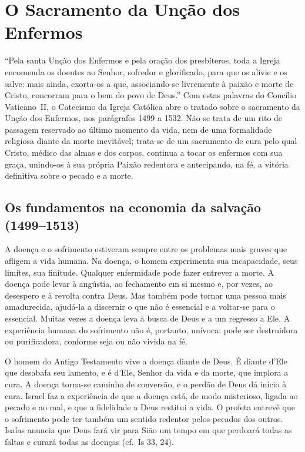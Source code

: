 \chapter{O Sacramento da Unção dos Enfermos}

``Pela santa Unção dos Enfermos e pela oração dos presbíteros, toda a Igreja encomenda os doentes ao Senhor, sofredor e glorificado, para que os alivie e os salve: mais ainda, exorta-os a que, associando-se livremente à paixão e morte de Cristo, concorram para o bem do povo de Deus.'' Com estas palavras do Concílio Vaticano~II, o Catecismo da Igreja Católica abre o tratado sobre o sacramento da Unção dos Enfermos, nos parágrafos 1499 a 1532. Não se trata de um rito de passagem reservado ao último momento da vida, nem de uma formalidade religiosa diante da morte inevitável; trata-se de um sacramento de cura pelo qual Cristo, médico das almas e dos corpos, continua a tocar os enfermos com sua graça, unindo-os à sua própria Paixão redentora e antecipando, na fé, a vitória definitiva sobre o pecado e a morte.

\section{Os fundamentos na economia da salvação (1499--1513)}

A doença e o sofrimento estiveram sempre entre os problemas mais graves que afligem a vida humana. Na doença, o homem experimenta sua incapacidade, seus limites, sua finitude. Qualquer enfermidade pode fazer entrever a morte. A doença pode levar à angústia, ao fechamento em si mesmo e, por vezes, ao desespero e à revolta contra Deus. Mas também pode tornar uma pessoa mais amadurecida, ajudá-la a discernir o que não é essencial e a voltar-se para o essencial. Muitas vezes a doença leva à busca de Deus e a um regresso a Ele. A experiência humana do sofrimento não é, portanto, unívoca: pode ser destruidora ou purificadora, conforme seja ou não vivida na fé.

O homem do Antigo Testamento vive a doença diante de Deus. É diante d'Ele que desabafa seu lamento, e é d'Ele, Senhor da vida e da morte, que implora a cura. A doença torna-se caminho de conversão, e o perdão de Deus dá início à cura. Israel faz a experiência de que a doença está, de modo misterioso, ligada ao pecado e ao mal, e que a fidelidade a Deus restitui a vida. O profeta entrevê que o sofrimento pode ter também um sentido redentor pelos pecados dos outros. Isaías anuncia que Deus fará vir para Sião um tempo em que perdoará todas as faltas e curará todas as doenças (cf.~Is 33, 24).

